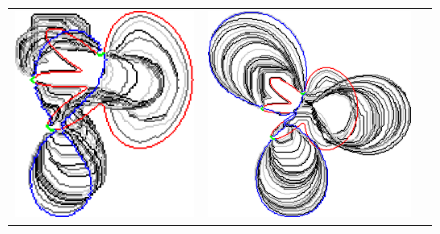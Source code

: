 \begin{figure}
\begin{tabular}{ccc}
\includegraphics[scale=0.25]{figures/chapter5/fixed-pixels/elastica/len_pen_0.01/flower-2/summary.pdf} &
\includegraphics[scale=0.25]{figures/chapter5/fixed-pixels/elastica/len_pen_0.001/flower-2/summary.pdf}\\[2em]

\end{tabular}
\end{figure}
